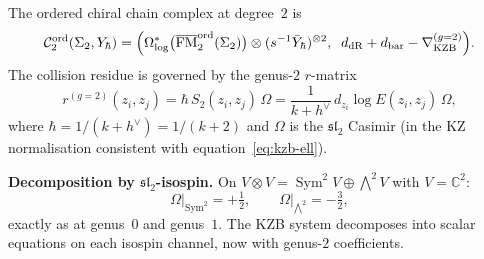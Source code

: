\documentclass[11pt,reqno]{amsart}
\theoremstyle{definition}
\theoremstyle{remark}
\newcommand{\cC}{\mathcal{C}}
\DeclareMathOperator{\FM}{FM}
\newcommand{\CC}{\mathbb{C}}
\numberwithin{equation}{section}
\begin{document}
The ordered chiral chain complex at degree~$2$ is
\begin{equation}\label{eq:g2-degree2-cx}
  \cC_2^{\mathrm{ord}}(\Sigma_2, Y_\hbar)
  = \Bigl(
  \Omega^*_{\log}\bigl(
  \overline{\FM}_2^{\mathrm{ord}}(\Sigma_2)\bigr)
  \otimes (s^{-1}\bar{Y}_\hbar)^{\otimes 2},
  \;\;
  d_{\mathrm{dR}} + d_{\mathrm{bar}}
  - \nabla_{\mathrm{KZB}}^{(g=2)}
  \Bigr).
\end{equation}
The collision residue is governed by the genus-$2$
$r$-matrix
\begin{equation}\label{eq:r-g2}
  r^{(g=2)}(z_i, z_j)
  = \hbar\,S_2(z_i, z_j)\,\Omega
  = \frac{1}{k + h^\vee}\,
  d_{z_i}\!\log E(z_i, z_j)\,\Omega,
\end{equation}
where $\hbar = 1/(k + h^\vee) = 1/(k+2)$ and $\Omega$
is the $\mathfrak{sl}_2$ Casimir (in the KZ normalisation
consistent with equation~\eqref{eq:kzb-ell}).

\smallskip
\noindent
\textbf{Decomposition by $\mathfrak{sl}_2$-isospin.}
On $V \otimes V = \operatorname{Sym}^2 V \oplus
\bigwedge\nolimits^2 V$ with $V = \CC^2$:
\[
  \Omega\big|_{\operatorname{Sym}^2} = +\tfrac{1}{2},
  \qquad
  \Omega\big|_{\bigwedge^2} = -\tfrac{3}{2},
\]
exactly as at genus~$0$ and genus~$1$. The KZB system
decomposes into scalar equations on each isospin channel,
now with genus-$2$ coefficients.
\end{document}
